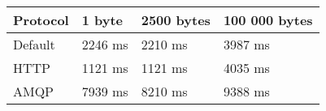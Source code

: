 \begin{tabularx}{\textwidth}{llll}
\hline
 Protocol   & 1 byte   & 2500 bytes   & 100 000 bytes   \\
\hline
 Default    & 2246 ms  & 2210 ms      & 3987 ms         \\
 HTTP       & 1121 ms  & 1121 ms      & 4035 ms         \\
 AMQP       & 7939 ms  & 8210 ms      & 9388 ms         \\
\hline
\end{tabularx}